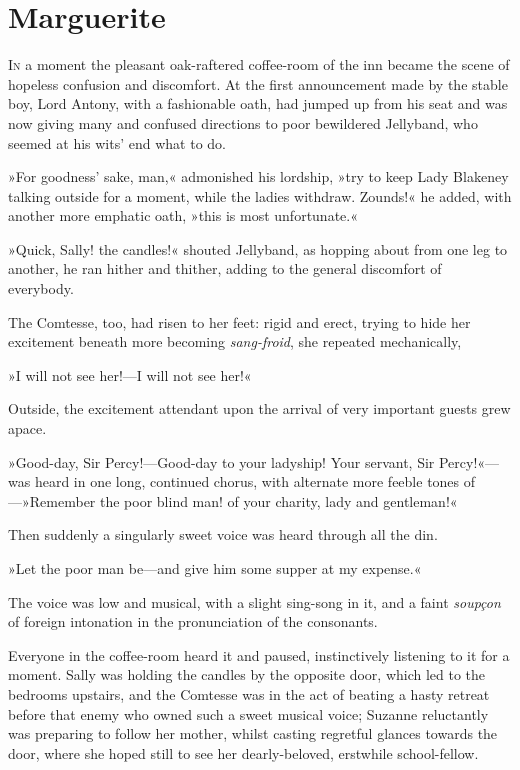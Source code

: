 
\chapter{Marguerite}
\lettrine[lines=4]{I}{n} a moment the pleasant oak-raftered coffee-room of the inn became the scene of hopeless confusion and discomfort. At the first announcement made by the stable boy, Lord Antony, with a fashionable oath, had jumped up from his seat and was now giving many and confused directions to poor bewildered Jellyband, who seemed at his wits' end what to do.

»For goodness' sake, man,« admonished his lordship, »try to keep Lady Blakeney talking outside for a moment, while the ladies withdraw. Zounds!« he added, with another more emphatic oath, »this is most unfortunate.«

»Quick, Sally! the candles!« shouted Jellyband, as hopping about from one leg to another, he ran hither and thither, adding to the general discomfort of everybody.

The Comtesse, too, had risen to her feet: rigid and erect, trying to hide her excitement beneath more becoming \textit{sang-froid}, she repeated mechanically,\longdash


»I will not see her!—I will not see her!«

Outside, the excitement attendant upon the arrival of very important guests grew apace.

»Good-day, Sir Percy!—Good-day to your ladyship! Your servant, Sir Percy!«—was heard in one long, continued chorus, with alternate more feeble tones of—»Remember the poor blind man! of your charity, lady and gentleman!«

Then suddenly a singularly sweet voice was heard through all the din.

»Let the poor man be—and give him some supper at my expense.«

The voice was low and musical, with a slight sing-song in it, and a faint \textit{soupçon} of foreign intonation in the pronunciation of the consonants.

Everyone in the coffee-room heard it and paused, instinctively listening to it for a moment. Sally was holding the candles by the opposite door, which led to the bedrooms upstairs, and the Comtesse was in the act of beating a hasty retreat before that enemy who owned such a sweet musical voice; Suzanne reluctantly was preparing to follow her mother, whilst casting regretful glances towards the door, where she hoped still to see her dearly-beloved, erstwhile school-fellow.

